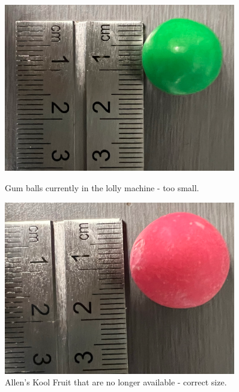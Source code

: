            \begin{figure}[H]
        \centering
        \begin{minipage}{0.4\textwidth}
            \centering
            \includegraphics[width = 0.9\textwidth]{2_images/gumBallMeas}
            \caption{Gum balls currently in the lolly machine - too small. }
            \label{fig:gumBallMeas}
        \end{minipage}\hfill
        \begin{minipage}{0.4\textwidth}
            \centering
            \includegraphics[width = 0.9\textwidth]{2_images/koolFruitMeas}
            \caption{Allen's Kool Fruit that are no longer available - correct size.}
            \label{fig:koolFruitMeas}
        \end{minipage}\hfill            
        \end{figure}  
        
